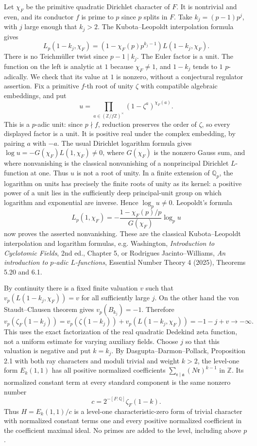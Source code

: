 Let \(\chi_F\) be the primitive quadratic Dirichlet character of \(F\).
It is nontrivial and even, and its conductor \(f\) is prime to \(p\)
since \(p\) splits in \(F\). Take \(k_j=(p-1)p^j\), with \(j\) large
enough that \(k_j>2\). The Kubota--Leopoldt interpolation formula gives
\[
 L_p(1-k_j,\chi_F)
   =(1-\chi_F(p)p^{k_j-1})L(1-k_j,\chi_F).
\]
There is no Teichm\"uller twist since \(p-1\mid k_j\).
The Euler factor is a unit. The function on the left is analytic
at \(1\) because \(\chi_F\ne1\), and \(1-k_j\) tends to \(1\)
\(p\)-adically. We check that its value at \(1\) is nonzero,
without a conjectural regulator assertion. Fix a primitive \(f\)-th
root of unity \(\zeta\) with compatible algebraic embeddings, and put
\[
 u=\prod_{a\in(\mathbb Z/f\mathbb Z)^\times}
                 (1-\zeta^a)^{\chi_F(a)}.
\]
This is a \(p\)-adic unit: since \(p\nmid f\), reduction preserves
the order of \(\zeta\), so every displayed factor is a unit.
It is positive real under the complex embedding, by pairing \(a\)
with \(-a\). The usual Dirichlet logarithm formula gives
\(\log u=-G(\chi_F)L(1,\chi_F)\ne0\), where \(G(\chi_F)\)
is the nonzero Gauss sum, and where nonvanishing is the classical
nonvanishing of a nonprincipal Dirichlet \(L\)-function at one.
Thus \(u\) is not a root of unity.
In a finite extension of \(\mathbb Q_p\), the logarithm on units
has precisely the finite roots of unity as its kernel: a positive
power of a unit lies in the sufficiently deep principal-unit group
on which logarithm and exponential are inverse. Hence
\(\log_p u\ne0\). Leopoldt's formula
\[
 L_p(1,\chi_F)
    =-\frac{1-\chi_F(p)/p}{G(\chi_F)}\log_p u
\]
now proves the asserted nonvanishing. These are the classical
Kubota--Leopoldt interpolation and logarithm formulas, e.g.
Washington, \emph{Introduction to Cyclotomic Fields}, 2nd ed.,
Chapter 5, or Rodrigues Jacinto--Williams,
\emph{An introduction to \(p\)-adic \(L\)-functions},
Essential Number Theory 4 (2025), Theorems 5.20 and 6.1.

By continuity there is a fixed finite valuation \(v\) such that
\(v_p(L(1-k_j,\chi_F))=v\) for all sufficiently large \(j\).
On the other hand the von Staudt--Clausen theorem gives
\(v_p(B_{k_j})=-1\). Therefore
\[
 v_p(\zeta_F(1-k_j))
   =v_p(\zeta(1-k_j))+v_p(L(1-k_j,\chi_F))
   =-1-j+v\longrightarrow-\infty.
\]
This uses the exact factorization of the real quadratic Dedekind
zeta function, not a uniform estimate for varying auxiliary fields.
Choose \(j\) so that this valuation is negative and put \(k=k_j\).
By Dasgupta--Darmon--Pollack, Proposition 2.1 with both ray
characters and moduli trivial and weight \(k>2\), the level-one
form \(E_k(1,1)\) has all positive normalized coefficients
\(\sum_{\mathfrak r\mid\mathfrak a}(N\mathfrak r)^{k-1}\)
in \(\mathbb Z\). Its normalized constant term at every standard
component is the same nonzero number
\[
                  c=2^{-[F:\mathbb Q]}\zeta_F(1-k).
\]
Thus \(H=E_k(1,1)/c\) is a level-one characteristic-zero form of
trivial character with normalized constant terms one and every
positive normalized coefficient in the coefficient maximal ideal.
No primes are added to the level, including above \(p\).

